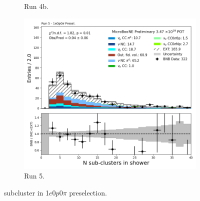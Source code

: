 \begin{figure}[H]
\begin{subfigure}[t]{0.32\linewidth}
        \caption{Run 4b.}
    \end{subfigure}%
    \hspace{0.2cm}%
    \begin{subfigure}[t]{0.32\linewidth}
        \includegraphics[width=\linewidth]{technote/Appendix_Preselection/Figures/1e0p0pi/Run5/subcluster_Run5_1e0p0pi_Presel.png}
        \caption{Run 5.}
    \end{subfigure}
    \caption{subcluster in 1$e$0$p$0$\pi$ preselection.}
\end{figure}

